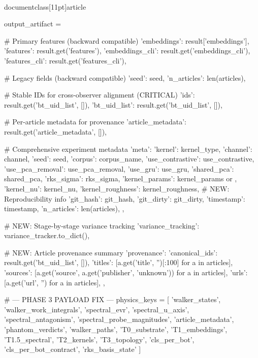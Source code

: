 \\documentclass[11pt]{article}
\begin{document}
\begin{CodeBlock}
        output_artifact = {
            # Primary features (backward compatible)
            'embeddings': result['embeddings'],
            'features': result.get('features'),
            'embeddings_cli': result.get('embeddings_cli'),
            'features_cli': result.get('features_cli'),
            
            # Legacy fields (backward compatible)
            'seed': seed,
            'n_articles': len(articles),
            
            # Stable IDs for cross-observer alignment (CRITICAL)
            'ids': result.get('bt_uid_list', []),
            'bt_uid_list': result.get('bt_uid_list', []),
            
            # Per-article metadata for provenance
            'article_metadata': result.get('article_metadata', []),
            
            # Comprehensive experiment metadata
            'meta': {
                'kernel': kernel_type,
                'channel': channel,
                'seed': seed,
                'corpus': corpus_name,
                'use_contrastive': use_contrastive,
                'use_pca_removal': use_pca_removal,
                'use_gru': use_gru,
                'shared_pca': shared_pca,
                'rks_sigma': rks_sigma,
                'kernel_params': kernel_params or {},
                'kernel_nu': kernel_nu,
                'kernel_roughness': kernel_roughness,
                # NEW: Reproducibility info
                'git_hash': git_hash,
                'git_dirty': git_dirty,
                'timestamp': timestamp,
                'n_articles': len(articles),
            },
            
            # NEW: Stage-by-stage variance tracking
            'variance_tracking': variance_tracker.to_dict(),
            
            # NEW: Article provenance summary
            'provenance': {
                'canonical_ids': result.get('bt_uid_list', []),
                'titles': [a.get('title', '')[:100] for a in articles],
                'sources': [a.get('source', a.get('publisher', 'unknown')) for a in articles],
                'urls': [a.get('url', '') for a in articles],
            },
        }
        
        # --- PHASE 3 PAYLOAD FIX ---
        physics_keys = [
            'walker_states', 'walker_work_integrals', 
            'spectral_evr', 'spectral_u_axis', 'spectral_antagonism', 'spectral_probe_magnitudes',
            'article_metadata', 'phantom_verdicts', 'walker_paths',
            'T0_substrate', 'T1_embeddings', 'T1.5_spectral', 'T2_kernels', 'T3_topology',
            'cls_per_bot', 'cls_per_bot_contract', 'rks_basis_state'
        ]
        

\end{CodeBlock}
\end{document}
